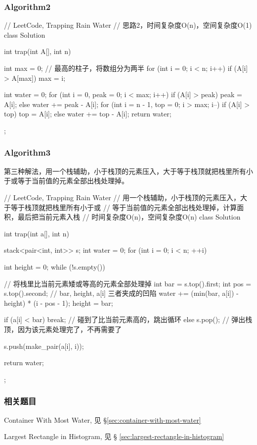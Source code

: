 \subsubsection{Algorithm2}
\begin{Code}
	// LeetCode, Trapping Rain Water
	// 思路2，时间复杂度O(n)，空间复杂度O(1)
	class Solution {
		int trap(int A[], int n) {
			int max = 0; // 最高的柱子，将数组分为两半
			for (int i = 0; i < n; i++)
				if (A[i] > A[max]) max = i;
			
			int water = 0;
			for (int i = 0, peak = 0; i < max; i++)
				if (A[i] > peak) peak = A[i];
				else water += peak - A[i];
			for (int i = n - 1, top = 0; i > max; i--)
				if (A[i] > top) top = A[i];
				else water += top - A[i];
			return water;
		}
	};
\end{Code}


\subsubsection{Algorithm3}
第三种解法，用一个栈辅助，小于栈顶的元素压入，大于等于栈顶就把栈里所有小于或等于当前值的元素全部出栈处理掉。
\begin{Code}
	// LeetCode, Trapping Rain Water
	// 用一个栈辅助，小于栈顶的元素压入，大于等于栈顶就把栈里所有小于或
	// 等于当前值的元素全部出栈处理掉，计算面积，最后把当前元素入栈
	// 时间复杂度O(n)，空间复杂度O(n)
	class Solution {
		int trap(int a[], int n) {
			stack<pair<int, int>> s;
			int water = 0;
			for (int i = 0; i < n; ++i) {
				int height = 0;
				while (!s.empty()) { // 将栈里比当前元素矮或等高的元素全部处理掉
					int bar = s.top().first;
					int pos = s.top().second;
					// bar, height, a[i] 三者夹成的凹陷
					water += (min(bar, a[i]) - height) * (i - pos - 1);
					height = bar;
					
					if (a[i] < bar) break; // 碰到了比当前元素高的，跳出循环
					else s.pop(); // 弹出栈顶，因为该元素处理完了，不再需要了
				}
				s.push(make_pair(a[i], i));
			}
			return water;
		}
	};
\end{Code}


\subsubsection{相关题目}
\begindot
\item Container With Most Water, 见 \S \ref{sec:container-with-most-water}
\item Largest Rectangle in Histogram, 见 \S 
\ref{sec:largest-rectangle-in-histogram}
\myenddot


